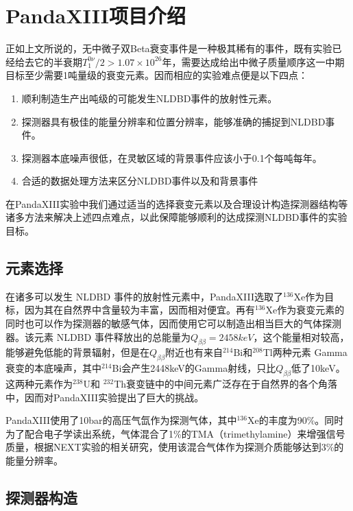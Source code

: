 \chapter{PandaXIII项目介绍}
\label{chapter:intro}

正如上文所说的，无中微子双Beta衰变事件是一种极其稀有的事件，既有实验已经给去它的半衰期$T^{0\nu}_1/2>1.07\times10^{26}$年，需要达成给出中微子质量顺序这一中期目标至少需要1吨量级的衰变元素。因而相应的实验难点便是以下四点：
\begin{enumerate}
    \item 顺利制造生产出吨级的可能发生NLDBD事件的放射性元素。
    \item 探测器具有极佳的能量分辨率和位置分辨率，能够准确的捕捉到NLDBD事件。
    \item 探测器本底噪声很低，在灵敏区域的背景事件应该小于0.1个每吨每年。
    \item 合适的数据处理方法来区分NLDBD事件以及和背景事件
\end{enumerate}
在PandaXIII实验中我们通过适当的选择衰变元素以及合理设计构造探测器结构等诸多方法来解决上述四点难点，以此保障能够顺利的达成探测NLDBD事件的实验目标。

\section{元素选择}

在诸多可以发生 NLDBD 事件的放射性元素中，PandaXIII选取了$^{136}$Xe作为目标，因为其在自然界中含量较为丰富，因而相对便宜。再有$^{136}$Xe作为衰变元素的同时也可以作为探测器的敏感气体，因而使用它可以制造出相当巨大的气体探测器。该元素 NLDBD 事件释放出的总能量为$Q_{\beta\beta}=2458keV$，这个能量相对较高，能够避免低能的背景辐射，但是在$Q_{\beta\beta}$附近也有来自$^{214}$Bi和$^{208}$Tl两种元素 Gamma 衰变的本底噪声，其中$^{214}$Bi会产生2448keV的Gamma射线，只比$Q_{\beta\beta}$低了10keV。这两种元素作为$^{238}$U和
$^{232}$Th衰变链中的中间元素广泛存在于自然界的各个角落中，因而对PandaXIII实验提出了巨大的挑战。

PandaXIII使用了10bar的高压气氙作为探测气体，其中$^{136}$Xe的丰度为90\%。同时为了配合电子学读出系统，气体混合了1\%的TMA（trimethylamine）来增强信号质量，根据NEXT实验的相关研究，使用该混合气体作为探测介质能够达到3\%的能量分辨率\supercite{azevedoh2015accurate}。

\section{探测器构造}

